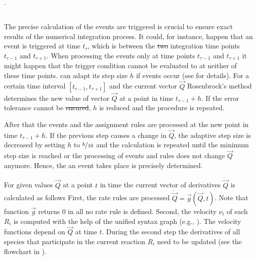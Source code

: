 \documentclass[10pt]{bmc_article}
\newenvironment{bmcformat}{\begin{raggedright}\baselineskip20pt\sloppy\setboolean{publ}{false}}{\end{raggedright}\baselineskip20pt\sloppy}
\begin{document}
\begin{bmcformat}
.

\subsection*{}

The precise calculation of the  events are triggered is crucial
to ensure exact results of the numerical integration process.
It could, for instance, happen that an event is triggered at time $t_{\tau}$,
which is between the \sout{two} integration time points $t_{\tau - 1}$ and $t_{\tau + 1}$.
When processing the events only at time points $t_{\tau - 1}$ and $t_{\tau + 1}$\COR{,}
it might happen that the trigger condition cannot be evaluated to \true at
neither of these time points.
 \cite{Press1993} can adapt its step size $h$ if events
occur (see  for details).
For a certain time interval $[t_{\tau - 1}, t_{\tau + 1}]$ and the current vector
$\vec{Q}$\COR{,} Rosenbrock's method determines the new value of vector $\vec{Q}$ at a
point in time $t_{\tau - 1} + h$.
If the error tolerance cannot be \sout{ensured},
$h$ is reduced and the procedure is repeated.

After that\COR{,} the events and the assignment rules are processed at the new
point in time $t_{\tau - 1} + h$.
If the previous step causes a change in $\vec{Q}$, the adaptive step size is
decreased by setting $h$ to $\nicefrac{h}{10}$ and the calculation is repeated
until  the minimum step size is reached or the processing of events
and  rules does not change $\vec{Q}$ anymore.
Hence, the  an event takes place is precisely determined.

For given values $\vec{Q}$ at a point $t$ in time the current vector of
derivatives $\dot{\vec{Q}}$ is calculated as follows
First, the rate rules are processed $\dot{\vec{Q}} = \vec{g}(\vec{Q}, t)$.
Note that function $\vec{g}$ returns 0 in all  no rate
rule is defined.
Second, the velocity $\nu_i$ of each  $R_i$ is computed
with the help of the unified syntax graph (e.g., ).
The velocity functions depend on $\vec{Q}$ at time $t$.
During the second step\COR{,} the derivatives of all species that participate in
the current reaction $R_i$ need to be updated (see the flowchart in
).


\end{bmcformat}
\end{document}

